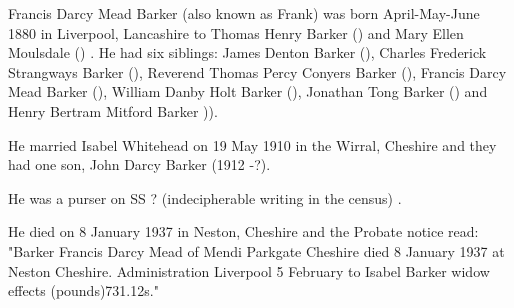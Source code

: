 
Francis Darcy Mead Barker (also known as Frank)  was born April-May-June 1880 in Liverpool, Lancashire to Thomas Henry Barker () and Mary Ellen Moulsdale ()  \cite{FBarkerBirth}. He had six siblings: James Denton Barker (), Charles Frederick Strangways Barker (), Reverend Thomas Percy Conyers Barker (), Francis Darcy Mead Barker (), William Danby Holt Barker (), Jonathan Tong Barker () and Henry Bertram Mitford Barker )).

He married Isabel Whitehead on 19 May 1910 in the Wirral, Cheshire \cite{FBarkerMarriage} and they had one son, John Darcy Barker (1912 -?). 

He was a purser on SS ? (indecipherable writing in the census) \cite{BarkerOccupation}.

He died on 8 January 1937 in	Neston, Cheshire \cite{FBarkerDeath} and the Probate notice read:
"Barker Francis Darcy Mead of Mendi Parkgate Cheshire died 8 January 1937 at Neston Cheshire. Administration Liverpool 5 February to Isabel Barker widow effects (pounds)731.12s."
